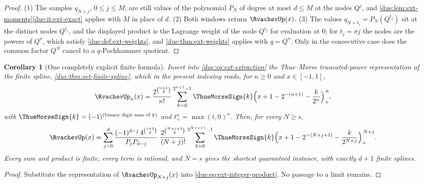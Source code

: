 \documentclass[11pt,oneside]{article}
\theoremstyle{plain}
\newtheorem{corollary}[theorem]{Corollary}
\theoremstyle{definition}
\theoremstyle{remark}
\newcommand{\upn}[1]{\RvachevUp_{#1}}
\newcommand{\Qq}{Q}                                         %
\newcommand{\qn}[1]{q_{#1}}                                 %
\begin{document}
\begin{proof}
(1) The samples $\qn{N+j}$, $0\le j\le M$, are still values of the polynomial
$P_{N}$ of degree at most $d\le M$ at the nodes $\Qq^{j}$, and
\cref{due:lem:ext-moments}\ref{due:it:ext-exact} applies with $M$ in place of
$d$.  (2) Both windows return $\RvachevUp(x)$.  (3) The values
$\qn{N+t_{j}}=P_{N}(\Qq^{t_{j}})$ sit at the distinct nodes $\Qq^{t_{j}}$, and
the displayed product is the Lagrange weight of the node $\Qq^{t_{j}}$ for
evaluation at $0$; for $t_{j}=\sigma j$ the nodes are the powers of
$\Qq^{\sigma}$, which satisfy \cref{due:def:ext-weights}, and
\cref{due:thm:ext-weights} applies with $q=\Qq^{\sigma}$.  Only in the
consecutive case does the common factor $\Qq^{N}$ cancel to a $q$-Pochhammer
quotient.
\end{proof}

\begin{corollary}[One completely explicit finite formula]
\label{due:cor:ext-explicit}
Insert into \cref{due:eq:ext-extraction} the Thue--Morse truncated-power
representation of the finite spline, \cref{due:thm:set-finite-spline}, which in
the present indexing reads, for $n\ge0$ and $x\in[-1,1]$,
\[
 \upn{n}(x)
 =\frac{2^{\binom{n+1}{2}}}{n!}
  \sum_{k=0}^{2^{n+1}-1}\ThueMorseSign{k}
  \Bigl(x+1-2^{-(n+1)}-\frac{k}{2^{n}}\Bigr)_{+}^{\,n},
\]
with $\ThueMorseSign{k}=(-1)^{\text{(binary digit sum of }k)}$ and
$t_{+}^{n}=\max(t,0)^{n}$.  Then, for every $N\ge s$,
\begin{equation}
 \RvachevUp(x)
 =\sum_{j=0}^{d}
 \frac{(-1)^{d-j}\,4^{\binom{j+1}{2}}}{P_{j}P_{d-j}}\;
 \frac{2^{\binom{N+j+1}{2}}}{(N+j)!}
 \sum_{k=0}^{2^{N+j+1}-1}\ThueMorseSign{k}
 \Bigl(x+1-2^{-(N+j+1)}-\frac{k}{2^{N+j}}\Bigr)_{+}^{\,N+j}.
 \label{due:eq:ext-explicit}
\end{equation}
Every sum and product is finite, every term is rational, and $N=s$ gives the
shortest guaranteed instance, with exactly $d+1$ finite splines.
\end{corollary}

\begin{proof}
Substitute the representation of $\upn{N+j}(x)$ into
\cref{due:eq:ext-integer-product}.  No passage to a limit remains.
\end{proof}
\end{document}
